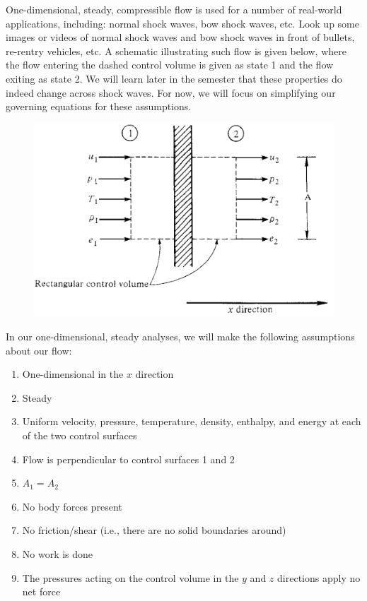 \documentclass[../main.tex]{subfiles}
\begin{document}

One-dimensional, steady, compressible flow is used for a number of real-world applications, including: normal shock waves, bow shock waves, etc.
Look up some images or videos of normal shock waves and bow shock waves in front of bullets, re-rentry vehicles, etc. 
A schematic illustrating such flow is given below, where the flow entering the dashed control volume is given as state 1 and the flow exiting as state 2.
We will learn later in the semester that these properties do indeed change across shock waves.
For now, we will focus on simplifying our governing equations for these assumptions. 

\begin{figure}[ht]
    \centering
    \includegraphics[scale=0.5]{images/problem3_diagram.png}
\end{figure}

In our one-dimensional, steady analyses, we will make the following assumptions about our flow:

\begin{enumerate}[label = (\roman*)]

    \item One-dimensional in the $x$ direction
    \item Steady
    \item Uniform velocity, pressure, temperature, density, enthalpy, and energy at each of the two control surfaces
    \item Flow is perpendicular to control surfaces 1 and 2
    \item \(A_1 = A_2\)
    \item No body forces present
    \item No friction/shear (i.e., there are no solid boundaries around)
    \item No work is done
    \item The pressures acting on the control volume in the $y$ and $z$ directions apply no net force

\end{enumerate}
\end{document}
